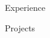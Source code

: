 \documentclass[letterpaper,11pt]{article}
\begin{document}
\header

\skills

\begin{resumeSection}{Experience}
  \experienceAMD
  \experienceContestOrganizer
  \experienceWeplate
\end{resumeSection}

\awardsSectionDefault

\begin{resumeSection}{Projects}
  \projectsCPTools
  \projectsWebsite
\end{resumeSection}

\education{\educationCourseworkCS}
\end{document}
